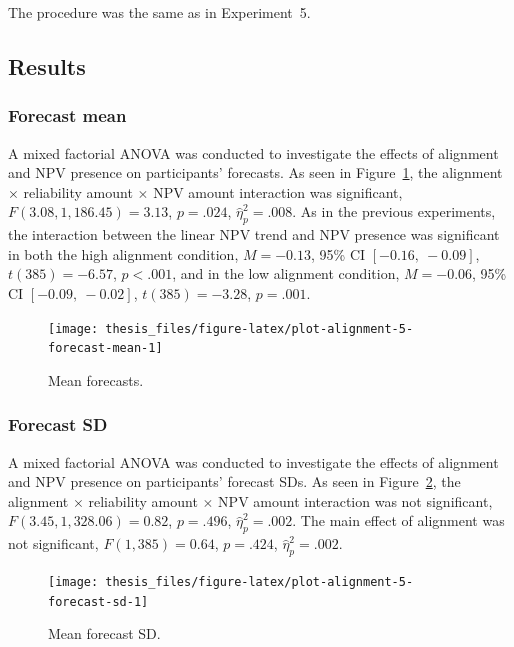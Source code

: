\documentclass[a4paper, nobind, dvipsnames]{templates/ociamthesis}
\theoremstyle{definition}
\theoremstyle{definition}
\theoremstyle{definition}
\theoremstyle{definition}
\theoremstyle{remark}
\begin{document}
The procedure was the same as in Experiment~5.

\subsection{Results}

\subsubsection{Forecast mean}

A mixed factorial ANOVA was conducted to investigate the effects of alignment
and NPV presence on participants' forecasts. As seen in
Figure~\ref{fig:plot-alignment-5-forecast-mean}, the alignment \(\times\)
reliability amount \(\times\) NPV amount interaction was significant,
\(F(3.08, 1,186.45) = 3.13\), \(p = .024\), \(\hat{\eta}^2_p = .008\).
As in the previous experiments, the interaction between the linear
NPV trend and NPV presence was significant in both the high alignment condition,
\(M = -0.13\), 95\% CI \([-0.16,~-0.09]\), \(t(385) = -6.57\), \(p < .001\), and in the
low alignment condition,
\(M = -0.06\), 95\% CI \([-0.09,~-0.02]\), \(t(385) = -3.28\), \(p = .001\).



\begin{figure}
\texttt{[image: thesis\_files/figure-latex/plot-alignment-5-forecast-mean-1]} \caption{Mean forecasts.}\label{fig:plot-alignment-5-forecast-mean}
\end{figure}

\hypertarget{forecast-sd-alignment-5}{%
\subsubsection{Forecast SD}\label{forecast-sd-alignment-5}}

A mixed factorial ANOVA was conducted to investigate the effects of alignment
and NPV presence on participants' forecast SDs. As seen in
Figure~\ref{fig:plot-alignment-5-forecast-sd}, the alignment \(\times\)
reliability amount \(\times\) NPV amount interaction was not significant,
\(F(3.45, 1,328.06) = 0.82\), \(p = .496\), \(\hat{\eta}^2_p = .002\). The
main effect of alignment was not significant,
\(F(1, 385) = 0.64\), \(p = .424\), \(\hat{\eta}^2_p = .002\).



\begin{figure}
\texttt{[image: thesis\_files/figure-latex/plot-alignment-5-forecast-sd-1]} \caption{Mean forecast SD.}\label{fig:plot-alignment-5-forecast-sd}
\end{figure}
\end{document}
